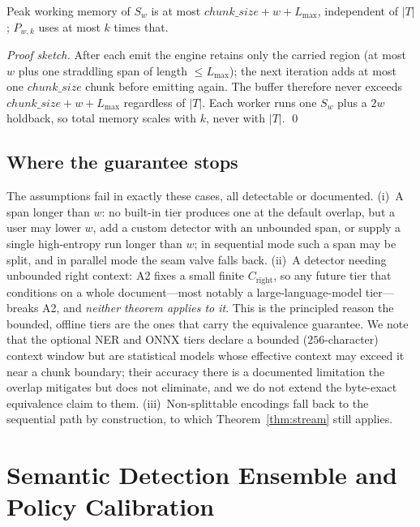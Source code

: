 \documentclass[runningheads]{llncs}
\newcommand{\T}{T}
\newcommand{\Sw}{S_{w}}
\newcommand{\Pwk}{P_{w,k}}
\newcommand{\Lmax}{L_{\max}}
\newcommand{\Cright}{C_{\mathrm{right}}}
\begin{document}
\begin{theorem}
\label{thm:mem}
Peak working memory of $\Sw$ is at most $\mathit{chunk\_size}+w+\Lmax$,
independent of $|\T|$; $\Pwk$ uses at most $k$ times that.
\end{theorem}

\begin{proof}[Proof sketch]
After each emit the engine retains only the carried region (at most $w$ plus one
straddling span of length $\le\Lmax$); the next iteration adds at most one
$\mathit{chunk\_size}$ chunk before emitting again. The buffer therefore never
exceeds $\mathit{chunk\_size}+w+\Lmax$ regardless of $|\T|$. Each worker runs one
$\Sw$ plus a $2w$ holdback, so total memory scales with $k$, never with
$|\T|$. \qed
\end{proof}

\subsection{Where the guarantee stops}
\label{sec:limits}
The assumptions fail in exactly these cases, all detectable or documented.
(i)~A span longer than $w$: no built-in tier produces one at the default overlap,
but a user may lower $w$, add a custom detector with an unbounded span, or supply
a single high-entropy run longer than $w$; in sequential mode such a span may be
split, and in parallel mode the seam valve falls back. (ii)~A detector needing
unbounded right context: A2 fixes a small finite $\Cright$, so any future tier
that conditions on a whole document---most notably a large-language-model
tier---breaks A2, and
\emph{neither theorem applies to it}. This is the principled reason the bounded,
offline tiers are the ones that carry the equivalence guarantee. We note that the
optional NER and ONNX tiers declare a bounded ($256$-character) context window but
are statistical models whose effective context may exceed it near a chunk
boundary; their accuracy there is a documented limitation the overlap mitigates
but does not eliminate, and we do not extend the byte-exact equivalence claim to
them. (iii)~Non-splittable encodings fall back to the sequential path by
construction, to which Theorem~\ref{thm:stream} still applies.

\section{Semantic Detection Ensemble and Policy Calibration}
\label{sec:semantic}
\end{document}
